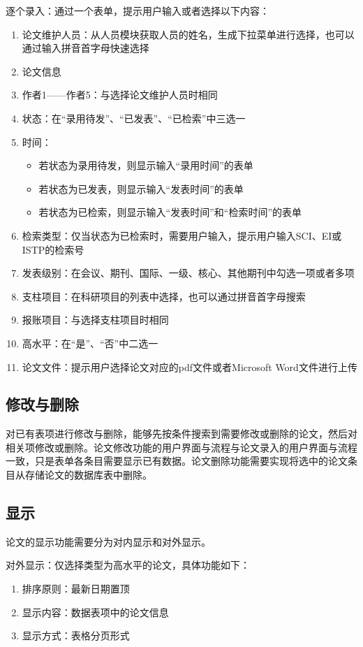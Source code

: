 逐个录入：通过一个表单，提示用户输入或者选择以下内容：

\begin{enumerate}
\item 论文维护人员：从人员模块获取人员的姓名，生成下拉菜单进行选择，也可以通过输入拼音首字母快速选择
\item 论文信息
\item 作者1——作者5：与选择论文维护人员时相同
\item 状态：在“录用待发”、“已发表”、“已检索”中三选一
\item 时间：
\begin{itemize}
	\item 若状态为录用待发，则显示输入“录用时间”的表单
	\item 若状态为已发表，则显示输入“发表时间”的表单
	\item 若状态为已检索，则显示输入“发表时间”和“检索时间”的表单
\end{itemize}
\item 检索类型：仅当状态为已检索时，需要用户输入，提示用户输入SCI、EI或ISTP的检索号
\item 发表级别：在会议、期刊、国际、一级、核心、其他期刊中勾选一项或者多项
\item 支柱项目：在科研项目的列表中选择，也可以通过拼音首字母搜索
\item 报账项目：与选择支柱项目时相同
\item 高水平：在“是”、“否”中二选一
\item 论文文件：提示用户选择论文对应的pdf文件或者Microsoft Word文件进行上传
\end{enumerate}

\subsection{修改与删除}

对已有表项进行修改与删除，能够先按条件搜索到需要修改或删除的论文，然后对相关项修改或删除。论文修改功能的用户界面与流程与论文录入的用户界面与流程一致，只是表单各条目需要显示已有数据。论文删除功能需要实现将选中的论文条目从存储论文的数据库表中删除。


\subsection{显示}

论文的显示功能需要分为对内显示和对外显示。

对外显示：仅选择类型为高水平的论文，具体功能如下：

\begin{enumerate}
\item 排序原则：最新日期置顶
\item 显示内容：数据表项中的论文信息
\item 显示方式：表格分页形式
\end{enumerate}

